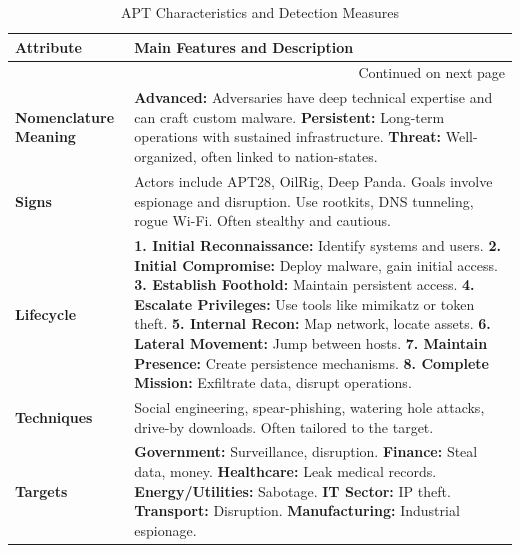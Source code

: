 {\vspace{1em}
\renewcommand{\arraystretch}{1.4}
\begin{longtable}{|p{4cm}|p{11cm}|}
\caption{APT Characteristics and Detection Measures} \\
\hline
\rowcolor{gray!20} \textbf{Attribute} & \textbf{Main Features and Description} \\
\hline
\endfirsthead

\hline \multicolumn{2}{r}{{Continued on next page}} \\
\endfoot

\hline
\endlastfoot

\textbf{Nomenclature Meaning} &
\textbf{Advanced:} Adversaries have deep technical expertise and can craft custom malware. \newline
\textbf{Persistent:} Long-term operations with sustained infrastructure. \newline
\textbf{Threat:} Well-organized, often linked to nation-states. \\
\hline

\textbf{Signs} &
Actors include APT28, OilRig, Deep Panda. Goals involve espionage and disruption. Use rootkits, DNS tunneling, rogue Wi-Fi. Often stealthy and cautious. \\
\hline

\textbf{Lifecycle} &
\textbf{1. Initial Reconnaissance:} Identify systems and users. \newline
\textbf{2. Initial Compromise:} Deploy malware, gain initial access. \newline
\textbf{3. Establish Foothold:} Maintain persistent access. \newline
\textbf{4. Escalate Privileges:} Use tools like mimikatz or token theft. \newline
\textbf{5. Internal Recon:} Map network, locate assets. \newline
\textbf{6. Lateral Movement:} Jump between hosts. \newline
\textbf{7. Maintain Presence:} Create persistence mechanisms. \newline
\textbf{8. Complete Mission:} Exfiltrate data, disrupt operations. \\
\hline

\textbf{Techniques} &
Social engineering, spear-phishing, watering hole attacks, drive-by downloads. Often tailored to the target. \\
\hline

\textbf{Targets} &
\textbf{Government:} Surveillance, disruption. \newline
\textbf{Finance:} Steal data, money. \newline
\textbf{Healthcare:} Leak medical records. \newline
\textbf{Energy/Utilities:} Sabotage. \newline
\textbf{IT Sector:} IP theft. \newline
\textbf{Transport:} Disruption. \newline
\textbf{Manufacturing:} Industrial espionage. \\
\hline


\end{longtable}}
